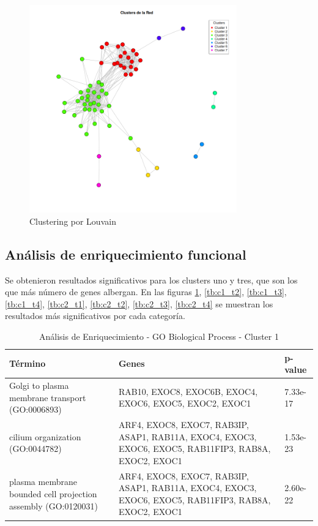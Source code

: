 \begin{figure}[h!]
	\includegraphics[width=0.8\textwidth]{figures/network_clusters_colored.png}
	\caption{Clustering por Louvain}
	\label{fig:Clustering}
\end{figure}



\subsection{Análisis de enriquecimiento funcional}

Se obtenieron resultados significativos para los clusters uno y tres, que son los que más número de genes albergan. En las figuras \ref{tb:c1_t1}, \ref{tb:c1_t2}, \ref{tb:c1_t3}, \ref{tb:c1_t4}, \ref{tb:c2_t1}, \ref{tb:c2_t2}, \ref{tb:c2_t3}, \ref{tb:c2_t4} se muestran los resultados más significativos por cada categoría.
\begin{table}[H]
	\centering
	\caption{Análisis de Enriquecimiento - GO Biological Process - Cluster 1}
	\label{tb:c1_t1}
	\begin{tabular}{|p{4cm}|p{4cm}|p{3cm}|}
		\hline
		\textbf{Término} & \textbf{Genes} & \textbf{p-value} \\ \hline
		Golgi to plasma membrane transport (GO:0006893) & RAB10, EXOC8, EXOC6B, EXOC4, EXOC6, EXOC5, EXOC2, EXOC1 & 7.33e-17 \\ \hline
		cilium organization (GO:0044782) & ARF4, EXOC8, EXOC7, RAB3IP, ASAP1, RAB11A, EXOC4, EXOC3, EXOC6, EXOC5, RAB11FIP3, RAB8A, EXOC2, EXOC1 & 1.53e-23 \\ \hline
		plasma membrane bounded cell projection assembly (GO:0120031) & ARF4, EXOC8, EXOC7, RAB3IP, ASAP1, RAB11A, EXOC4, EXOC3, EXOC6, EXOC5, RAB11FIP3, RAB8A, EXOC2, EXOC1 & 2.60e-22 \\ \hline
	\end{tabular}
\end{table}


